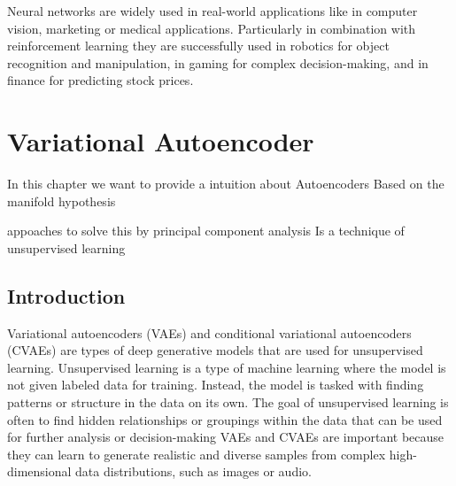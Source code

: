 Neural networks are widely used in real-world applications like in computer vision, marketing or medical applications. Particularly in combination with reinforcement learning they are successfully used in robotics for object recognition and manipulation, in gaming for complex decision-making, and in finance for predicting stock prices.

% 

% 


\section{Variational Autoencoder}
In this chapter we want to provide a intuition about Autoencoders 
Based on the manifold hypothesis

appoaches to solve this by principal component analysis
Is a technique of unsupervised learning

\subsection{Introduction}

Variational autoencoders (VAEs) and conditional variational autoencoders (CVAEs) are types of deep generative models that are used for unsupervised learning. Unsupervised learning is a type of machine learning where the model is not given labeled data for training. Instead, the model is tasked with finding patterns or structure in the data on its own. The goal of unsupervised learning is often to find hidden relationships or groupings within the data that can be used for further analysis or decision-making
VAEs and CVAEs are important because they can learn to generate realistic and diverse samples from complex high-dimensional data distributions, such as images or audio.

